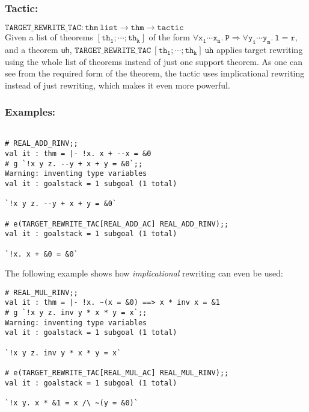\documentclass{llncs}
\newcommand*\TARGETTAC{\texttt{TARGET\_REWRITE\_TAC}\xspace}
\begin{document}
		\subsubsection{Tactic:} 
		$\mathtt{\TARGETTAC: thm\ list \to thm \to tactic}$\\
    Given a list of theorems $\mathtt{[th_1;\cdots;th_k]}$
    of the form $\mathtt{\forall x_1\cdots x_n.\ P \Rightarrow \forall y_1\cdots y_m.\ l = r}$,
    and a theorem \texttt{uh},
		$\mathtt{\TARGETTAC\ [th_1;\cdots;th_k]\ uh}$ applies target rewriting using the whole list of theorems
    instead of just one support theorem. As one can see from the required form of the theorem,
    the tactic uses implicational rewriting instead of just rewriting, which makes it even more powerful.

    \subsubsection{Examples:}
    \begin{example}
    \begin{verbatim}

# REAL_ADD_RINV;;
val it : thm = |- !x. x + --x = &0
# g `!x y z. --y + x + y = &0`;;
Warning: inventing type variables
val it : goalstack = 1 subgoal (1 total)

`!x y z. --y + x + y = &0`

# e(TARGET_REWRITE_TAC[REAL_ADD_AC] REAL_ADD_RINV);;
val it : goalstack = 1 subgoal (1 total)

`!x. x + &0 = &0` \end{verbatim}
    \end{example}

    \begin{example}
    The following example shows how \emph{implicational} rewriting can even be used:
    \begin{verbatim}
# REAL_MUL_RINV;;
val it : thm = |- !x. ~(x = &0) ==> x * inv x = &1
# g `!x y z. inv y * x * y = x`;;
Warning: inventing type variables
val it : goalstack = 1 subgoal (1 total)

`!x y z. inv y * x * y = x`

# e(TARGET_REWRITE_TAC[REAL_MUL_AC] REAL_MUL_RINV);;
val it : goalstack = 1 subgoal (1 total)

`!x y. x * &1 = x /\ ~(y = &0)` \end{verbatim}    
    \end{example}
\end{document}
